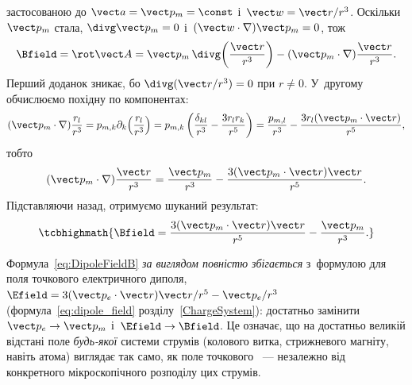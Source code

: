 застосованою до $\vect a=\vect p_m=\const$ і~$\vect w = \vect r/r^3$. Оскільки $\vect p_m$
стала, $\divg\vect p_m=0$ і~$(\vect w\cdot\nabla)\vect p_m=0$, тож
\begin{equation*}
	\Bfield = \rot\vect A = \vect p_m\,\divg\!\left(\frac{\vect r}{r^3}\right) - (\vect p_m\cdot\nabla)\frac{\vect r}{r^3}.
\end{equation*}
Перший доданок зникає, бо $\divg(\vect r/r^3)=0$ при $r\neq0$. У~другому обчислюємо
похідну по компонентах:
\begin{equation*}
	(\vect p_m\cdot\nabla)\frac{r_l}{r^3}
	= p_{m,k}\partial_k\!\left(\frac{r_l}{r^3}\right)
	= p_{m,k}\left(\frac{\delta_{kl}}{r^3} - \frac{3r_l r_k}{r^5}\right)
	= \frac{p_{m,l}}{r^3} - \frac{3r_l(\vect p_m\cdot\vect r)}{r^5},
\end{equation*}
тобто
\begin{equation*}
	(\vect p_m\cdot\nabla)\frac{\vect r}{r^3} = \frac{\vect p_m}{r^3} - \frac{3(\vect p_m\cdot\vect r)\vect r}{r^5}.
\end{equation*}
Підставляючи назад, отримуємо шуканий результат:
\begin{equation}\label{eq:DipoleFieldB}
	\tcbhighmath{
		\Bfield = \frac{3(\vect p_m\cdot\vect r)\vect r}{r^5} - \frac{\vect p_m}{r^3}.
	}
\end{equation}

Формула~\eqref{eq:DipoleFieldB} \emph{за виглядом повністю збігається} з~формулою для
поля точкового електричного диполя, $\Efield = 3(\vect p_e\cdot\vect r)\vect r/r^5 -
	\vect p_e/r^3$ (формула~\eqref{eq:dipole_field} розділу~\ref{ChargeSystem}): достатньо замінити $\vect p_e \to \vect
	p_m$ і~$\Efield \to \Bfield$. Це означає, що на достатньо великій відстані поле
\emph{будь-якої} системи струмів (колового витка, стрижневого магніту, навіть атома)
виглядає так само, як поле точкового ~--- незалежно від
конкретного мікроскопічного розподілу цих струмів.


